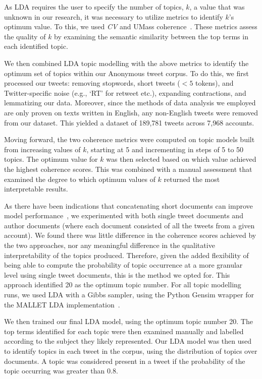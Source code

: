 \documentclass[letterpaper]{article}
\begin{document}
As LDA requires the user to specify the number of topics, $k$, a value that was unknown in our research, it was necessary to utilize metrics to identify $k$'s optimum value. To this, we used \textit{CV} and UMass coherence~\cite{Syed2017}. These metrics assess the quality of $k$ by examining the semantic similarity between the top terms in each identified topic.

We then combined LDA topic modelling with the above metrics to identify the optimum set of topics within our Anonymous tweet corpus. To do this, we first processed our tweets: removing stopwords, short tweets ($<5$ tokens), and Twitter-specific noise (e.g., `RT' for retweet etc.), expanding contractions, and lemmatizing our data. Moreover, since the methods of data analysis we employed are only proven on texts written in English, any non-English tweets were removed from our dataset. This yielded a dataset of 189,781 tweets across 7,968 accounts.

Moving forward, the two coherence metrics were computed on topic models built from increasing values of $k$, starting at 5 and incrementing in steps of 5 to 50 topics. The optimum value for $k$ was then selected based on which value achieved the highest coherence scores. This was combined with a manual assessment that examined the degree to which optimum values of $k$ returned the most interpretable results.

As there have been indications that concatenating short documents can improve model performance~\cite{Kigerl2018}, we experimented with both single tweet documents and author documents (where each document consisted of all the tweets from a given account). We found there was little difference in the coherence scores achieved by the two approaches, nor any meaningful difference in the qualitative interpretability of the topics produced. Therefore, given the added flexibility of being able to compute the probability of topic occurrence at a more granular level using single tweet documents, this is the method we opted for. This approach identified 20 as the optimum topic number. For all topic modelling runs, we used LDA with a Gibbs sampler, using the Python Gensim wrapper for the MALLET LDA implementation~\cite{Gensim}.

We then trained our final LDA model, using the optimum topic number 20. The top terms identified for each topic were then examined manually and labelled according to the subject they likely represented. Our LDA model was then used to identify topics in each tweet in the corpus, using the distribution of topics over documents. A topic was considered present in a tweet if the probability of the topic occurring was greater than 0.8. 
\end{document}
